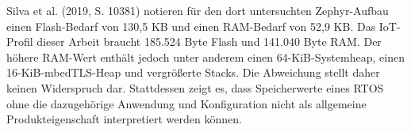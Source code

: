 Silva et al. (2019, S. 10381) notieren f{\"u}r den dort untersuchten Zephyr-Aufbau einen Flash-Bedarf von 130,5 KB und einen RAM-Bedarf von 52,9 KB. Das IoT-Profil dieser Arbeit braucht 185.524 Byte Flash und 141.040 Byte RAM. Der h{\"o}here RAM-Wert enth{\"a}lt jedoch unter anderem einen 64-KiB-Systemheap, einen 16-KiB-mbedTLS-Heap und vergr{\"o}{\ss}erte Stacks. Die Abweichung stellt daher keinen Widerspruch dar. Stattdessen zeigt es, dass Speicherwerte eines RTOS ohne die dazugeh{\"o}rige Anwendung und Konfiguration nicht als allgemeine Produkteigenschaft interpretiert werden k{\"o}nnen.
